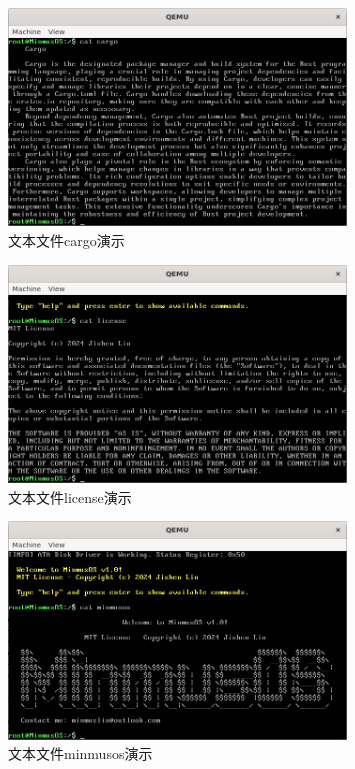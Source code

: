 \begin{figure}[htbp]
    \centering
    \includegraphics[width=0.8\textwidth]{figures/CargoFilePresentation.png}
    \caption{文本文件cargo演示}
\end{figure}

\begin{figure}[htbp]
    \centering
    \includegraphics[width=0.8\textwidth]{figures/LicenseFilePresentation.png}
    \caption{文本文件license演示}
\end{figure}

\begin{figure}[htbp]
    \centering
    \includegraphics[width=0.8\textwidth]{figures/MinmusOSFilePresentation.png}
    \caption{文本文件minmusos演示}
\end{figure}

